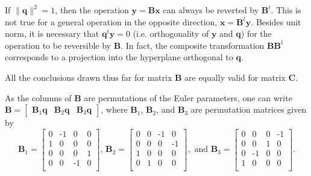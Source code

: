 \documentclass[aip,jcp,reprint,amsmath,amssymb,raggedbottom]{revtex4-1}
\newcommand{\mt}[1]{\boldsymbol{\mathbf{#1}}}           %
\newcommand{\vt}[1]{\boldsymbol{\mathbf{#1}}}           %
\newcommand{\tr}[1]{#1^t}                               %
\begin{document}
If $\lVert \vt q \lVert^2 = 1$, then the operation $\vt y = \mt B \vt x$ can always be reverted by $\tr{\mt B}$. This is not true for a general operation in the opposite direction, $\vt x = \tr{\mt B} \vt y$. Besides unit norm, it is necessary that $\tr{\vt q}\vt y = 0$ (i.e. orthogonality of $\vt y$ and $\vt q$) for the operation to be reversible by $\mt B$. In fact, the composite transformation $\mt B\tr{\mt B}$ corresponds to a projection into the hyperplane orthogonal to $\vt q$.\cite{Dichmann1999}

All the conclusions drawn thus far for matrix $\mt B$ are equally valid for matrix $\mt C$.

As the columns of $\mt B$ are permutations of the Euler parameters, one can write $\mt B = [\begin{array}{ccc}{\mt B}_1{\vt q} & {\mt B}_2{\vt q} & {\mt B}_3{\vt q}\end{array}]$, where $\mt B_1$, $\mt B_2$, and $\mt B_3$ are permutation matrices given by
\[
{\mt B}_1 = \left[ \begin{smallmatrix}
 0 & \text{-}1 &  0 &  0 \\
 1 &  0 &  0 &  0 \\
 0 &  0 &  0 &  1 \\
 0 &  0 & \text{-}1 &  0 \\
\end{smallmatrix} \right], \,
{\mt B}_2 = \left[ \begin{smallmatrix}
 0 &  0 & \text{-}1 &  0 \\
 0 &  0 &  0 & \text{-}1 \\
 1 &  0 &  0 &  0 \\
 0 &  1 &  0 &  0 \\
\end{smallmatrix} \right], \text{ and }
{\mt B}_3 = \left[ \begin{smallmatrix}
 0 &  0 &  0 & \text{-}1 \\
 0 &  0 &  1 &  0 \\
 0 & \text{-}1 &  0 &  0 \\
 1 &  0 &  0 &  0 \\
\end{smallmatrix} \right].
\]
\end{document}
